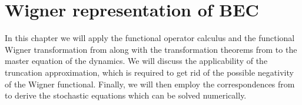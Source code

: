 \chapter{Wigner representation of BEC}
\label{cha:wigner-bec}

In this chapter we will apply the functional operator calculus and the functional Wigner transformation from  along with the transformation theorems from  to the master equation of the  dynamics.
We will discuss the applicability of the truncation approximation, which is required to get rid of the possible negativity of the Wigner functional.
Finally, we will then employ the correspondences from  to derive the stochastic equations which can be solved numerically.











